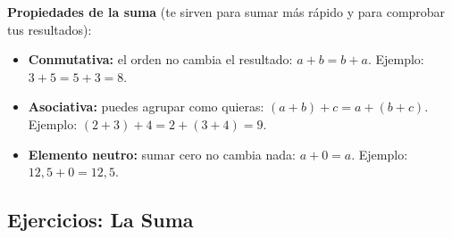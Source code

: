 \documentclass[12pt, letterpaper]{article}
\begin{document}
\begin{cuadroadvertencia}
  \textbf{Propiedades de la suma} (te sirven para sumar más rápido y para comprobar tus resultados):
  \begin{itemize}
    \item \textbf{Conmutativa:} el orden no cambia el resultado: $a + b = b + a$. Ejemplo: $3 + 5 = 5 + 3 = 8$.
    \item \textbf{Asociativa:} puedes agrupar como quieras: $(a + b) + c = a + (b + c)$. Ejemplo: $(2 + 3) + 4 = 2 + (3 + 4) = 9$.
    \item \textbf{Elemento neutro:} sumar cero no cambia nada: $a + 0 = a$. Ejemplo: $12{,}5 + 0 = 12{,}5$.
  \end{itemize}
\end{cuadroadvertencia}

\subsection{Ejercicios: La Suma}
\end{document}
